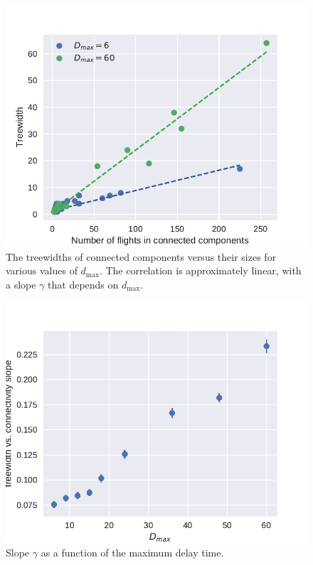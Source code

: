 \begin{figure}[h]
\includegraphics[width=\columnwidth]{pics/instances/treewidth_connectivity.pdf}
\caption[Correlation between connected component size and treewidth]{
The treewidths of connected components versus their sizes for various values of $d_{\max}$.
The correlation is approximately linear, with a slope $\gamma$ that depends on $d_{\max}$.
}
\label{fig:tw-vs-CC-size}
\end{figure}

\begin{figure}[h]
\includegraphics[width=\columnwidth]{pics/instances/treewidth_pl.pdf}
\caption[Treewidth-size correlation coefficient vs. $d_{\max}$]{Slope $\gamma$ as a function
  of the maximum delay time.}
\label{fig:treewidth-size-correlation}
\end{figure}
